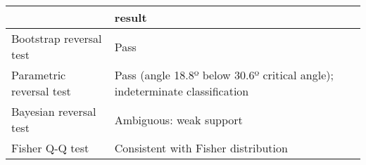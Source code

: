 \begin{tabular}{ll}
\toprule
{} &                                                                       result \\
\midrule
Bootstrap reversal test  &                                                                         Pass \\
Parametric reversal test &  Pass (angle 18.8º below 30.6º critical angle); indeterminate classification \\
Bayesian reversal test   &                                                      Ambiguous: weak support \\
Fisher Q-Q test          &                                          Consistent with Fisher distribution \\
\bottomrule
\end{tabular}
